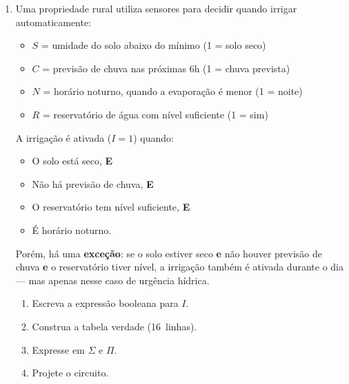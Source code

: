 \documentclass[11pt, a4paper]{article}
\begin{document}
\begin{enumerate}
\item Uma propriedade rural utiliza sensores para decidir quando irrigar automaticamente:
\begin{itemize}
  \item $S$ = umidade do solo abaixo do m\'{i}nimo (1 = solo seco)
  \item $C$ = previs\~{a}o de chuva nas pr\'{o}ximas 6h (1 = chuva prevista)
  \item $N$ = hor\'{a}rio noturno, quando a evapora\c{c}\~{a}o \'{e} menor (1 = noite)
  \item $R$ = reservat\'{o}rio de \'{a}gua com n\'{i}vel suficiente (1 = sim)
\end{itemize}
A irriga\c{c}\~{a}o \'{e} ativada ($I = 1$) quando:
\begin{itemize}
  \item O solo est\'{a} seco, \textbf{E}
  \item N\~{a}o h\'{a} previs\~{a}o de chuva, \textbf{E}
  \item O reservat\'{o}rio tem n\'{i}vel suficiente, \textbf{E}
  \item \'{E} hor\'{a}rio noturno.
\end{itemize}
Por\'{e}m, h\'{a} uma \textbf{exce\c{c}\~{a}o}: se o solo estiver seco \textbf{e} n\~{a}o houver previs\~{a}o de chuva \textbf{e} o reservat\'{o}rio tiver n\'{i}vel, a irriga\c{c}\~{a}o tamb\'{e}m \'{e} ativada durante o dia --- mas apenas nesse caso de urg\^{e}ncia h\'{i}drica.
\begin{enumerate}
  \item Escreva a express\~{a}o booleana para $I$.
  \item Construa a tabela verdade (16~linhas).
  \item Expresse em $\Sigma$ e $\Pi$.
  \item Projete o circuito.
\end{enumerate}

\end{enumerate}
\end{document}
